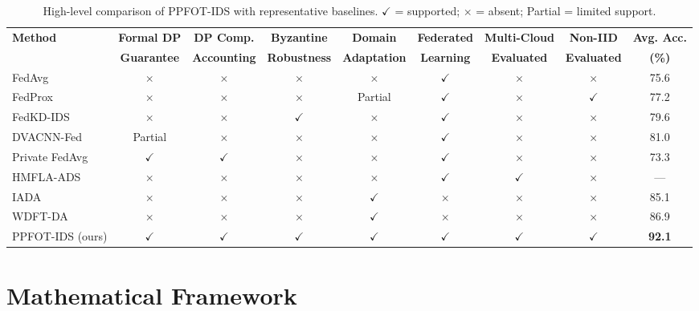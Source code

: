 \documentclass{ieeeaccess}
\theoremstyle{plain}
\theoremstyle{definition}
\theoremstyle{remark}
\begin{document}
\begin{table}[!t]
\renewcommand{\arraystretch}{1.3}
\caption{High-level comparison of PPFOT-IDS with representative baselines. $\checkmark$ = supported; $\times$ = absent; Partial = limited support.}
\label{tab:comparison_summary}
\centering
\begin{tabular}{lcccccccc}
\hline
\textbf{Method} & \textbf{Formal DP} & \textbf{DP Comp.} & \textbf{Byzantine} & \textbf{Domain} & \textbf{Federated} & \textbf{Multi-Cloud} & \textbf{Non-IID} & \textbf{Avg. Acc.} \\
 & \textbf{Guarantee} & \textbf{Accounting} & \textbf{Robustness} & \textbf{Adaptation} & \textbf{Learning} & \textbf{Evaluated} & \textbf{Evaluated} & \textbf{(\%)} \\
\hline
FedAvg~\cite{mcmahan2017} & $\times$ & $\times$ & $\times$ & $\times$ & $\checkmark$ & $\times$ & $\times$ & 75.6 \\
FedProx~\cite{li2020} & $\times$ & $\times$ & $\times$ & Partial & $\checkmark$ & $\times$ & $\checkmark$ & 77.2 \\
FedKD-IDS~\cite{zhao2022} & $\times$ & $\times$ & $\checkmark$ & $\times$ & $\checkmark$ & $\times$ & $\times$ & 79.6 \\
DVACNN-Fed~\cite{preuveneers2018} & Partial & $\times$ & $\times$ & $\times$ & $\checkmark$ & $\times$ & $\times$ & 81.0 \\
Private FedAvg~\cite{abadi2016} & $\checkmark$ & $\checkmark$ & $\times$ & $\times$ & $\checkmark$ & $\times$ & $\times$ & 73.3 \\
HMFLA-ADS~\cite{hmfla2025} & $\times$ & $\times$ & $\times$ & $\times$ & $\checkmark$ & $\checkmark$ & $\times$ & --- \\
IADA~\cite{chen2023} & $\times$ & $\times$ & $\times$ & $\checkmark$ & $\times$ & $\times$ & $\times$ & 85.1 \\
WDFT-DA~\cite{rasheed2022} & $\times$ & $\times$ & $\times$ & $\checkmark$ & $\times$ & $\times$ & $\times$ & 86.9 \\
\hline
PPFOT-IDS (ours) & $\checkmark$ & $\checkmark$ & $\checkmark$ & $\checkmark$ & $\checkmark$ & $\checkmark$ & $\checkmark$ & \textbf{92.1} \\
\hline
\end{tabular}
\end{table}

\section{Mathematical Framework}
\label{sec:framework}
\end{document}
